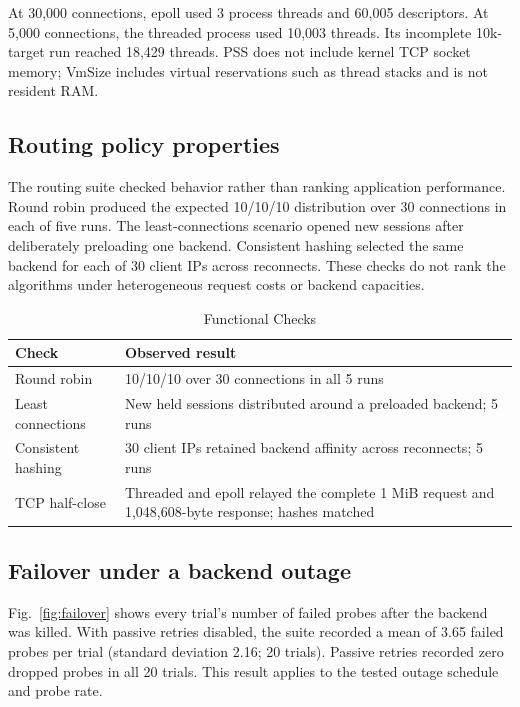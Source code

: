\documentclass[conference]{IEEEtran}
\begin{document}
At 30,000 connections, epoll used 3 process threads and 60,005 descriptors. At 5,000 connections, the threaded process used 10,003 threads. Its incomplete 10k-target run reached 18,429 threads. PSS does not include kernel TCP socket memory; VmSize includes virtual reservations such as thread stacks and is not resident RAM.

\subsection{Routing policy properties}
The routing suite checked behavior rather than ranking application performance. Round robin produced the expected 10/10/10 distribution over 30 connections in each of five runs. The least-connections scenario opened new sessions after deliberately preloading one backend. Consistent hashing selected the same backend for each of 30 client IPs across reconnects. These checks do not rank the algorithms under heterogeneous request costs or backend capacities.

\begin{table}[!t]
\caption{Functional Checks}
\label{tab:functional}
\centering
\footnotesize
\begin{tabular}{p{}p{}}
\toprule
Check & Observed result \\
\midrule
Round robin & 10/10/10 over 30 connections in all 5 runs \\
Least connections & New held sessions distributed around a preloaded backend; 5 runs \\
Consistent hashing & 30 client IPs retained backend affinity across reconnects; 5 runs \\
TCP half-close & Threaded and epoll relayed the complete 1 MiB request and 1,048,608-byte response; hashes matched \\
\bottomrule
\end{tabular}
\end{table}

\subsection{Failover under a backend outage}
Fig.~\ref{fig:failover} shows every trial's number of failed probes after the backend was killed. With passive retries disabled, the suite recorded a mean of 3.65 failed probes per trial (standard deviation 2.16; 20 trials). Passive retries recorded zero dropped probes in all 20 trials. This result applies to the tested outage schedule and probe rate.
\end{document}
